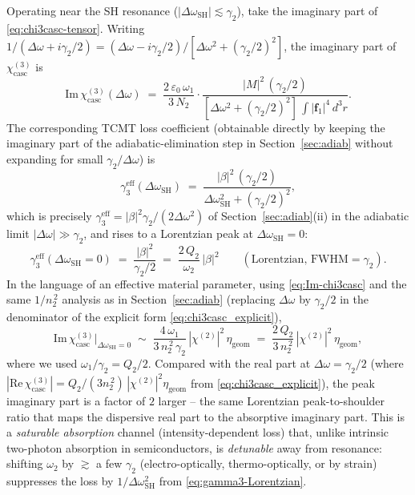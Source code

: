 \documentclass[11pt,a4paper]{article}
\newcommand{\eps}{\varepsilon}
\newcommand{\bvec}[1]{\mathbf{#1}}
\newcommand{\f}{\bvec{f}}
\newcommand{\dthreer}{\,d^{3}r}
\newcommand{\chitwo}{\chi^{(2)}}
\newcommand{\chithree}{\chi^{(3)}}
\newcommand{\Dom}{\Delta\omega}
\begin{document}
Operating near the SH resonance ($|\Dom_\text{SH}|\lesssim\gamma_2$),
take the imaginary part of \eqref{eq:chi3casc-tensor}.  Writing
$1/(\Dom+i\gamma_2/2)=(\Dom-i\gamma_2/2)/[\Dom^{2}+(\gamma_2/2)^{2}]$,
the imaginary part of $\chithree_\text{casc}$ is
\begin{equation}
  \mathrm{Im}\,\chithree_\text{casc}(\Dom)
   \;=\;\frac{2\,\eps_0\,\omega_1}{3\,N_2}\cdot
        \frac{|M|^{2}\,(\gamma_2/2)}{[\Dom^{2}+(\gamma_2/2)^{2}]\,\int|\f_1|^{4}\dthreer}.
  \label{eq:Im-chi3casc}
\end{equation}
The corresponding TCMT loss coefficient (obtainable directly by
keeping the imaginary part of the adiabatic-elimination step in
Section~\ref{sec:adiab} without expanding for small $\gamma_2/\Dom$)
is
\begin{equation}
  \gamma_3^\text{eff}(\Dom_\text{SH})
   \;=\;\frac{|\beta|^{2}\,(\gamma_2/2)}{\Dom_\text{SH}^{2}+(\gamma_2/2)^{2}},
  \label{eq:gamma3-Lorentzian}
\end{equation}
which is precisely $\gamma_3^\text{eff}=|\beta|^{2}\gamma_2/(2\Dom^{2})$
of Section~\ref{sec:adiab}(ii) in the adiabatic limit $|\Dom|\gg\gamma_2$,
and rises to a Lorentzian peak at $\Dom_\text{SH}=0$:
\begin{equation}
  \gamma_3^\text{eff}(\Dom_\text{SH}=0)\;=\;\frac{|\beta|^{2}}{\gamma_2/2}
  \;=\;\frac{2\,Q_2}{\omega_2}\,|\beta|^{2}
  \qquad(\text{Lorentzian, FWHM}=\gamma_2).
  \label{eq:gamma3-peak}
\end{equation}
In the language of an effective material parameter, using
\eqref{eq:Im-chi3casc} and the same $1/n_2^{\,2}$ analysis as in
Section~\ref{sec:adiab} (replacing $\Dom$ by $\gamma_2/2$ in the
denominator of the explicit form \eqref{eq:chi3casc_explicit}),
\begin{equation}
  \mathrm{Im}\,\chithree_\text{casc}\big|_{\Dom_\text{SH}=0}
       \;\sim\;\frac{4\,\omega_1}{3\,n_2^{\,2}\,\gamma_2}\,|\chitwo|^{2}\,\eta_\text{geom}
       \;=\;\frac{2\,Q_2}{3\,n_2^{\,2}}\,|\chitwo|^{2}\,\eta_\text{geom},
  \label{eq:Im-chi3-explicit}
\end{equation}
where we used $\omega_1/\gamma_2 = Q_2/2$.  Compared with the real
part at $\Dom=\gamma_2/2$ (where $|\mathrm{Re}\,\chithree_\text{casc}|
=Q_2/(3 n_2^{\,2})\,|\chitwo|^{2}\eta_\text{geom}$ from
\eqref{eq:chi3casc_explicit}), the peak imaginary part is a factor of
$2$ larger -- the same Lorentzian peak-to-shoulder ratio that maps the
dispersive real part to the absorptive imaginary part.
This is a \emph{saturable absorption} channel (intensity-dependent
loss) that, unlike intrinsic two-photon absorption in semiconductors,
is \emph{detunable} away from resonance: shifting $\omega_2$ by
$\gtrsim$ a few $\gamma_2$ (electro-optically, thermo-optically, or
by strain) suppresses the loss by $1/\Dom_\text{SH}^{2}$ from
\eqref{eq:gamma3-Lorentzian}.
\end{document}

